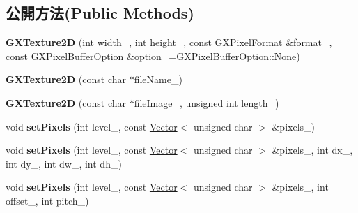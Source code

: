 \subsection*{公開方法(Public Methods)}
\begin{DoxyCompactItemize}
\item 
{\bfseries G\+X\+Texture2D} (int width\+\_\+, int height\+\_\+, const \hyperlink{class_magnum_1_1_g_x_pixel_format}{G\+X\+Pixel\+Format} \&format\+\_\+, const \hyperlink{class_magnum_1_1_g_x_pixel_buffer_option}{G\+X\+Pixel\+Buffer\+Option} \&option\+\_\+=G\+X\+Pixel\+Buffer\+Option\+::\+None)\hypertarget{class_magnum_1_1_g_x_texture2_d_a2ca824fcc53e6ae0e173f766498a903c}{}\label{class_magnum_1_1_g_x_texture2_d_a2ca824fcc53e6ae0e173f766498a903c}

\item 
{\bfseries G\+X\+Texture2D} (const char $\ast$file\+Name\+\_\+)\hypertarget{class_magnum_1_1_g_x_texture2_d_a9025f664d2fa0cc7e0f4b911809fde10}{}\label{class_magnum_1_1_g_x_texture2_d_a9025f664d2fa0cc7e0f4b911809fde10}

\item 
{\bfseries G\+X\+Texture2D} (const char $\ast$file\+Image\+\_\+, unsigned int length\+\_\+)\hypertarget{class_magnum_1_1_g_x_texture2_d_ac49b237e5e8dc37812b043bada830181}{}\label{class_magnum_1_1_g_x_texture2_d_ac49b237e5e8dc37812b043bada830181}

\item 
void {\bfseries set\+Pixels} (int level\+\_\+, const \hyperlink{class_magnum_1_1_vector}{Vector}$<$ unsigned char $>$ \&pixels\+\_\+)\hypertarget{class_magnum_1_1_g_x_texture2_d_a99b1fd15acda4d83f0834939e2f5a1ed}{}\label{class_magnum_1_1_g_x_texture2_d_a99b1fd15acda4d83f0834939e2f5a1ed}

\item 
void {\bfseries set\+Pixels} (int level\+\_\+, const \hyperlink{class_magnum_1_1_vector}{Vector}$<$ unsigned char $>$ \&pixels\+\_\+, int dx\+\_\+, int dy\+\_\+, int dw\+\_\+, int dh\+\_\+)\hypertarget{class_magnum_1_1_g_x_texture2_d_a61f6f8b275a8ef7cdbec91286ee4bcc9}{}\label{class_magnum_1_1_g_x_texture2_d_a61f6f8b275a8ef7cdbec91286ee4bcc9}

\item 
void {\bfseries set\+Pixels} (int level\+\_\+, const \hyperlink{class_magnum_1_1_vector}{Vector}$<$ unsigned char $>$ \&pixels\+\_\+, int offset\+\_\+, int pitch\+\_\+)\hypertarget{class_magnum_1_1_g_x_texture2_d_a7cbed9618f7b462c4af2860b262509f0}{}\label{class_magnum_1_1_g_x_texture2_d_a7cbed9618f7b462c4af2860b262509f0}


\end{DoxyCompactItemize}
